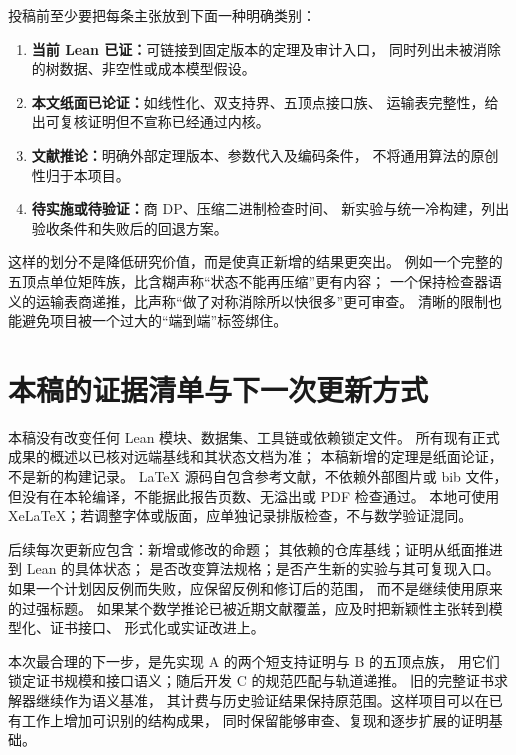 \documentclass[UTF8,a4paper,11pt,fontset=fandol]{ctexart}
\theoremstyle{definition}
\begin{document}
投稿前至少要把每条主张放到下面一种明确类别：
\begin{enumerate}
\item \textbf{当前 Lean 已证：}可链接到固定版本的定理及审计入口，
      同时列出未被消除的树数据、非空性或成本模型假设。
\item \textbf{本文纸面已论证：}如线性化、双支持界、五顶点接口族、
      运输表完整性，给出可复核证明但不宣称已经通过内核。
\item \textbf{文献推论：}明确外部定理版本、参数代入及编码条件，
      不将通用算法的原创性归于本项目。
\item \textbf{待实施或待验证：}商 DP、压缩二进制检查时间、
      新实验与统一冷构建，列出验收条件和失败后的回退方案。
\end{enumerate}
这样的划分不是降低研究价值，而是使真正新增的结果更突出。
例如一个完整的五顶点单位矩阵族，比含糊声称“状态不能再压缩”更有内容；
一个保持检查器语义的运输表商递推，比声称“做了对称消除所以快很多”更可审查。
清晰的限制也能避免项目被一个过大的“端到端”标签绑住。

\section{本稿的证据清单与下一次更新方式}

本稿没有改变任何 Lean 模块、数据集、工具链或依赖锁定文件。
所有现有正式成果的概述以已核对远端基线和其状态文档为准；
本稿新增的定理是纸面论证，不是新的构建记录。
LaTeX 源码自包含参考文献，不依赖外部图片或 bib 文件，
但没有在本轮编译，不能据此报告页数、无溢出或 PDF 检查通过。
本地可使用 XeLaTeX；若调整字体或版面，应单独记录排版检查，不与数学验证混同。

后续每次更新应包含：新增或修改的命题；
其依赖的仓库基线；证明从纸面推进到 Lean 的具体状态；
是否改变算法规格；是否产生新的实验与其可复现入口。
如果一个计划因反例而失败，应保留反例和修订后的范围，
而不是继续使用原来的过强标题。
如果某个数学推论已被近期文献覆盖，应及时把新颖性主张转到模型化、证书接口、
形式化或实证改进上。

本次最合理的下一步，是先实现 A 的两个短支持证明与 B 的五顶点族，
用它们锁定证书规模和接口语义；随后开发 C 的规范匹配与轨道递推。
旧的完整证书求解器继续作为语义基准，
其计费与历史验证结果保持原范围。这样项目可以在已有工作上增加可识别的结构成果，
同时保留能够审查、复现和逐步扩展的证明基础。
\end{document}
